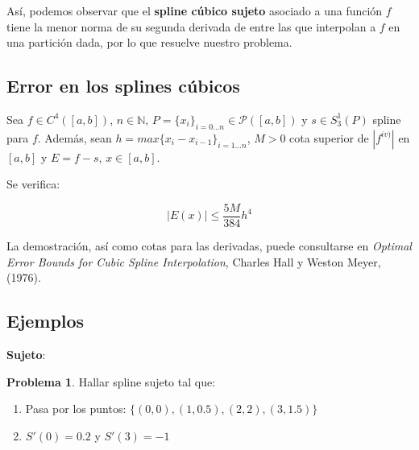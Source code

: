\documentclass[11pt,spanish,]{article}
\theoremstyle{definition} \newtheorem*{definicion}{Definición}
\newtheorem*{problema}{Problema} \theoremstyle{remark}
\begin{document}
Así, podemos observar que el \textbf{spline cúbico sujeto} asociado a
una función $f$ tiene la menor norma de su segunda derivada de entre las
que interpolan a $f$ en una partición dada, por lo que resuelve nuestro
problema.

\subsection{Error en los splines
cúbicos}\label{error-en-los-splines-cuxfabicos}

\begin{teorema}
Sea $f \in C^4([a,b])$, $n \in \mathbb{N}$, $P = \{x_i\}_{i = 0...n} \in \mathscr{P}([a,b])$ y  $s \in S_3^1(P)$ spline para $f$. Además, sean $h = max\{x_i - x_{i-1}\}_{i = 1...n}$, $M > 0$ cota superior de $|f^{iv)}|$ en $[a,b]$ y $E = f - s$, $x \in [a,b]$.

Se verifica:

\begin{equation} \label{eq:errorS31}
|E(x)| \leq \frac{5M}{384}h^4
\end{equation}

\end{teorema}

La demostración, así como cotas para las derivadas, puede consultarse en
\emph{Optimal Error Bounds for Cubic Spline Interpolation}, Charles Hall
y Weston Meyer, (1976).

\subsection{Ejemplos}\label{ejemplos-1}

\textbf{Sujeto}:

\begin{problema}

Hallar spline sujeto tal que:
\begin{enumerate}
\item Pasa por los puntos: $\{(0,0),(1,0.5),(2,2), (3,1.5)\}$
\item $S'(0) = 0.2$ y $S'(3) = -1$
\end{enumerate}
\end{problema}

\vspace*{\baselineskip}
\end{document}
